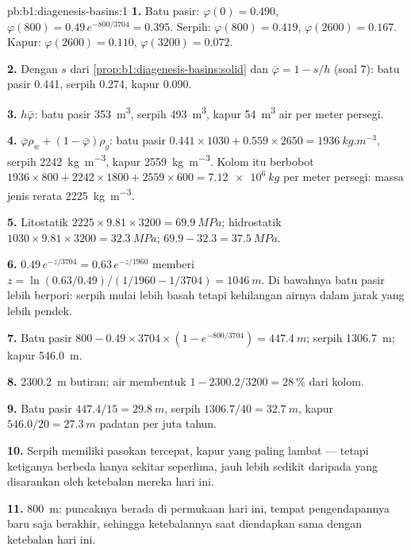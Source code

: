 \begin{solution}{pb:b1:diagenesis-basins:1}
\textbf{1.} Batu pasir: $\varphi(0) = \num{0.490}$, $\varphi(800) =
0.49\,e^{-800/3704} = \num{0.395}$. Serpih: $\varphi(800) = \num{0.419}$,
$\varphi(2600) = \num{0.167}$. Kapur: $\varphi(2600) = \num{0.110}$,
$\varphi(3200) = \num{0.072}$.

\textbf{2.} Dengan $s$ dari \cref{prop:b1:diagenesis-basins:solid} dan $\bar\varphi
= 1 - s/h$ (soal 7): batu pasir \num{0.441}, serpih \num{0.274}, kapur
\num{0.090}.

\textbf{3.} $h\bar\varphi$: batu pasir \qty{353}{m^3}, serpih \qty{493}{m^3}, kapur
\qty{54}{m^3} air per meter persegi.

\textbf{4.} $\bar\varphi\rho_w + (1 - \bar\varphi)\rho_g$: batu pasir
$0.441\times1030 + 0.559\times2650 = \qty{1936}{kg.m^{-3}}$, serpih
\qty{2242}{kg.m^{-3}}, kapur \qty{2559}{kg.m^{-3}}. Kolom itu berbobot
$1936\times800 + 2242\times1800 + 2559\times600 = \qty{7.12e6}{kg}$ per meter persegi:
massa jenis rerata \qty{2225}{kg.m^{-3}}.

\textbf{5.} Litostatik $2225\times9.81\times3200 = \qty{69.9}{MPa}$; hidrostatik
$1030\times9.81\times3200 = \qty{32.3}{MPa}$;  $69.9 - 32.3 = \qty{37.5}{MPa}$.

\textbf{6.} $0.49\,e^{-z/3704} = 0.63\,e^{-z/1960}$ memberi $z = \ln(0.63/0.49)
/(1/1960 - 1/3704) = \qty{1046}{m}$. Di bawahnya batu pasir lebih berpori: serpih
mulai lebih basah tetapi kehilangan airnya dalam jarak yang lebih pendek.

\textbf{7.} Batu pasir $800 - 0.49\times3704\times(1 - e^{-800/3704}) =
\qty{447.4}{m}$; serpih \qty{1306.7}{m}; kapur \qty{546.0}{m}.

\textbf{8.} \qty{2300.2}{m} butiran; air membentuk $1 - 2300.2/3200 =
\qty{28}{\%}$ dari kolom.

\textbf{9.} Batu pasir $447.4/15 = \qty{29.8}{m}$, serpih $1306.7/40 =
\qty{32.7}{m}$, kapur $546.0/20 = \qty{27.3}{m}$ padatan per juta tahun.

\textbf{10.} Serpih memiliki pasokan tercepat, kapur yang paling lambat --- tetapi
ketiganya berbeda hanya sekitar seperlima, jauh lebih sedikit daripada yang disarankan
oleh ketebalan mereka hari ini.

\textbf{11.} \qty{800}{m}: puncaknya berada di permukaan hari ini, tempat pengendapannya
baru saja berakhir, sehingga ketebalannya saat diendapkan sama dengan ketebalan hari ini.


\end{solution}
